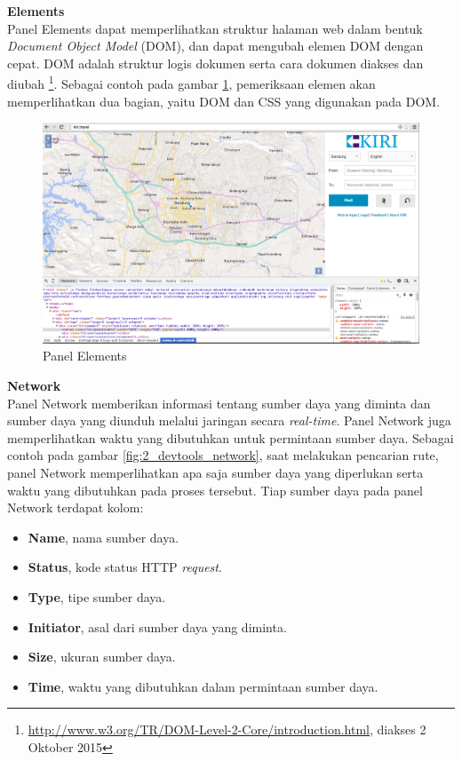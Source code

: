 \documentclass[a4paper,twoside]{article}
\begin{document}
\textbf{Elements}\\
Panel Elements dapat memperlihatkan struktur halaman web dalam bentuk \textit{Document Object Model} (DOM), dan dapat mengubah elemen DOM dengan cepat. DOM adalah struktur logis dokumen serta cara dokumen diakses dan diubah \footnote{\url{http://www.w3.org/TR/DOM-Level-2-Core/introduction.html}, diakses 2 Oktober 2015}. Sebagai contoh pada gambar \ref{fig:2_devtools_elements}, pemeriksaan elemen akan memperlihatkan dua bagian, yaitu DOM dan CSS yang digunakan pada DOM.

\begin{figure}[H]
	\centering
	\includegraphics[scale=0.3]{Gambar/devtools-elements}
	\caption{Panel Elements} 
	\label{fig:2_devtools_elements}
\end{figure}

\textbf{Network}\\
Panel Network memberikan informasi tentang sumber daya yang diminta dan sumber daya yang diunduh melalui jaringan secara \textit{real-time}. Panel Network juga memperlihatkan waktu yang dibutuhkan untuk permintaan sumber daya. Sebagai contoh pada gambar \ref{fig:2_devtools_network}, saat melakukan pencarian rute, panel Network memperlihatkan apa saja sumber daya yang diperlukan serta waktu yang dibutuhkan pada proses tersebut. Tiap sumber daya pada panel Network terdapat kolom:

\begin{itemize}
	\item \textbf{Name}, nama sumber daya.
	\item \textbf{Status}, kode status HTTP \textit{request}.
	\item \textbf{Type}, tipe sumber daya.
	\item \textbf{Initiator}, asal dari sumber daya yang diminta.
	\item \textbf{Size}, ukuran sumber daya.
	\item \textbf{Time}, waktu yang dibutuhkan dalam permintaan sumber daya.
\end{itemize}
\end{document}
